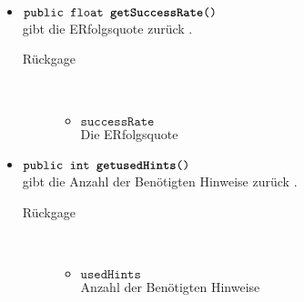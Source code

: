 \begin{description}
\begin{itemize}
			
			\item $\texttt{public  float \textbf{getSuccessRate}()}$ \\ gibt die ERfolgsquote zurück .
				\begin{description}
				\item[Rückgage] \hfill \\
					\vspace{-.8cm}
					\begin{itemize}
						\item $\texttt{successRate }$ \\Die ERfolgsquote 
					\end{itemize}	
					\end{description}
			
\item $\texttt{public  int \textbf{getusedHints}()}$ \\ gibt die Anzahl der Benötigten Hinweise zurück .
				\begin{description}
				\item[Rückgage] \hfill \\
					\vspace{-.8cm}
					\begin{itemize}
						\item $\texttt{usedHints }$ \\Anzahl der Benötigten Hinweise
					\end{itemize}	
					\end{description}
					

\end{itemize}
\end{description}
